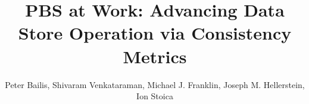 \documentclass{sig-alternate}
\begin{document}
\title{PBS at Work: Advancing Data Store Operation via Consistency Metrics}

\author{Peter Bailis, Shivaram Venkataraman, Michael J. Franklin, Joseph M. Hellerstein, Ion Stoica\\
\\
}


\maketitle






\balance


\begin{comment}
\section{Acknowledgments}
We would like to thank Jonathan Ellis for his help in reviewing and integrating
our Cassandra patch.  WThank LinkedIn folks who helped in Voldemort measurement patch
etc.

This research is supported in part by NSF CISE Expeditions award CCF-1139158,
gifts from Amazon Web Services, Google, SAP,  Blue Goji, Cisco, Cloudera,
Ericsson, General Electric, Hewlett Packard, Huawei, Intel, Microsoft, NetApp,
Oracle, Quanta, Splunk, VMware and by DARPA (contract \#FA8650-11-C-7136).

TODO: Add any other funding agencies ?
\end{comment}




\end{document}
